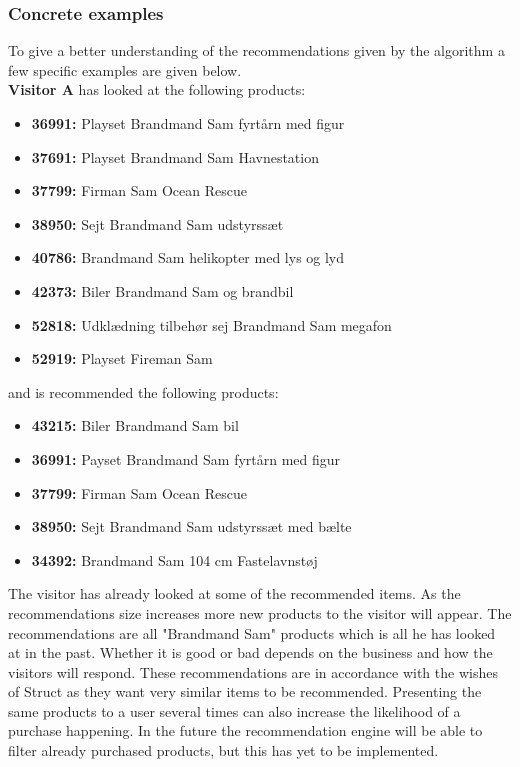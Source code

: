 \subsubsection{Concrete examples}
To give a better understanding of the recommendations given by the algorithm a few specific examples are given below. \\

\textbf{Visitor A} has looked at the following products:
\begin{itemize}
\item \textbf{36991: }Playset Brandmand Sam fyrtårn med figur
\item \textbf{37691: }Playset Brandmand Sam Havnestation
\item \textbf{37799: }Firman Sam Ocean Rescue
\item \textbf{38950: }Sejt Brandmand Sam udstyrssæt
\item \textbf{40786: }Brandmand Sam helikopter med lys og lyd
\item \textbf{42373: }Biler Brandmand Sam og brandbil
\item \textbf{52818: }Udklædning tilbehør sej Brandmand Sam megafon
\item \textbf{52919: }Playset Fireman Sam
\end{itemize}
and is recommended the following products:
\begin{itemize}
\item \textbf{43215: }Biler Brandmand Sam bil
\item \textbf{36991: }Payset Brandmand Sam fyrtårn med figur
\item \textbf{37799: }Firman Sam Ocean Rescue
\item \textbf{38950: }Sejt Brandmand Sam udstyrssæt med bælte
\item \textbf{34392:} Brandmand Sam 104 cm Fastelavnstøj
\end{itemize}

The visitor has already looked at some of the recommended items. As the recommendations size increases more new products to the visitor will appear. The recommendations are all "Brandmand Sam" products which is all he has looked at in the past. Whether it is good or bad depends on the business and how the visitors will respond. These recommendations are in accordance with the wishes of \gls{Struct} as they want very similar items to be recommended. Presenting the same products to a user several times can also increase the likelihood of a purchase happening. In the future the recommendation engine will be able to filter already purchased products, but this has yet to be implemented. \\\\

